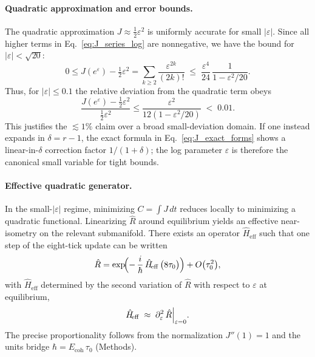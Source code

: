 \documentclass[aps,prx,twocolumn,superscriptaddress,nofootinbib]{revtex4-2}
\newcommand{\Rhat}{\hat{R}}
\newcommand{\Hhat}{\hat{H}}
\newcommand{\Jcost}{J}
\newcommand{\Ccost}{C}
\newcommand{\TauZero}{\tau_{0}}
\begin{document}
\paragraph*{Quadratic approximation and error bounds.} The quadratic approximation \(\Jcost \approx \tfrac12\varepsilon^2\) is uniformly accurate for small \(|\varepsilon|\). Since all higher terms in Eq.~\eqref{eq:J_series_log} are nonnegative, we have the bound for \(|\varepsilon|<\sqrt{20}\):
\begin{equation}\label{eq:bound_series}
  0 \le \Jcost(e^{\varepsilon}) - \tfrac12\varepsilon^2 = \sum_{k\ge 2}\frac{\varepsilon^{2k}}{(2k)!}
  \;\le\; \frac{\varepsilon^4}{24}\,\frac{1}{1-\varepsilon^2/20}.
\end{equation}
Thus, for \(|\varepsilon|\le 0.1\) the relative deviation from the quadratic term obeys
\begin{equation}\label{eq:relative_error}
  \frac{\Jcost(e^{\varepsilon})-\tfrac12\varepsilon^2}{\tfrac12\varepsilon^2} \le \frac{\varepsilon^2}{12(1-\varepsilon^2/20)} \;<\; 0.01.
\end{equation}
This justifies the \(\lesssim\!1\%\) claim over a broad small-deviation domain. If one instead expands in \(\delta=r-1\), the exact formula in Eq.~\eqref{eq:J_exact_forms} shows a linear-in-\(\delta\) correction factor \(1/(1+\delta)\); the log parameter \(\varepsilon\) is therefore the canonical small variable for tight bounds.

\paragraph*{Effective quadratic generator.} In the small-\(|\varepsilon|\) regime, minimizing \(\Ccost=\int \Jcost\,dt\) reduces locally to minimizing a quadratic functional. Linearizing \(\Rhat\) around equilibrium yields an effective near-isometry on the relevant submanifold. There exists an operator \(\Hhat_{\!\mathrm{eff}}\) such that one step of the eight-tick update can be written
\begin{equation}\label{eq:linearization}
  \Rhat = \exp\!\Bigl(-\,\frac{i}{\hbar}\,\Hhat_{\!\mathrm{eff}}\,\bigl(8\TauZero\bigr)\Bigr) + O\bigl(\TauZero^2\bigr),
\end{equation}
with \(\Hhat_{\!\mathrm{eff}}\) determined by the second variation of \(\Rhat\) with respect to \(\varepsilon\) at equilibrium,
\begin{equation}\label{eq:Heff_from_R}
  \Hhat_{\!\mathrm{eff}} \;\approx\; \Bigl.\partial_{\varepsilon}^2\,\Rhat\Bigr|_{\varepsilon=0}.
\end{equation}
The precise proportionality follows from the normalization \(\Jcost''(1)=1\) and the units bridge \(\hbar=E_{\!\mathrm{coh}}\,\TauZero\) (Methods).
\end{document}

